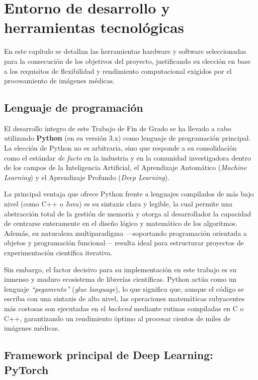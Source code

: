 \chapter{Entorno de desarrollo y herramientas tecnológicas}


En este capítulo se detallan las herramientas hardware y software seleccionadas para la consecución de los objetivos del proyecto, justificando su elección en base a los requisitos de flexibilidad y rendimiento computacional exigidos por el procesamiento de imágenes médicas.

\section{Lenguaje de programación}

El desarrollo íntegro de este Trabajo de Fin de Grado se ha llevado a cabo utilizando \textbf{Python} (en su versión 3.x) como lenguaje de programación principal. La elección de Python no es arbitraria, sino que responde a su consolidación como el estándar \textit{de facto} en la industria y en la comunidad investigadora dentro de los campos de la Inteligencia Artificial, el Aprendizaje Automático (\textit{Machine Learning}) y el Aprendizaje Profundo (\textit{Deep Learning}).

La principal ventaja que ofrece Python frente a lenguajes compilados de más bajo nivel (como C++ o Java) es su sintaxis clara y legible, la cual permite una abstracción total de la gestión de memoria y otorga al desarrollador la capacidad de centrarse enteramente en el diseño lógico y matemático de los algoritmos. Además, su naturaleza multiparadigma —soportando programación orientada a objetos y programación funcional— resulta ideal para estructurar proyectos de experimentación científica iterativa.

Sin embargo, el factor decisivo para su implementación en este trabajo es su inmenso y maduro ecosistema de librerías científicas. Python actúa como un lenguaje \textit{``pegamento''} (\textit{glue language}), lo que significa que, aunque el código se escriba con una sintaxis de alto nivel, las operaciones matemáticas subyacentes más costosas son ejecutadas en el \textit{backend} mediante rutinas compiladas en C o C++, garantizando un rendimiento óptimo al procesar cientos de miles de imágenes médicas.

\section{Framework principal de Deep Learning: PyTorch}

